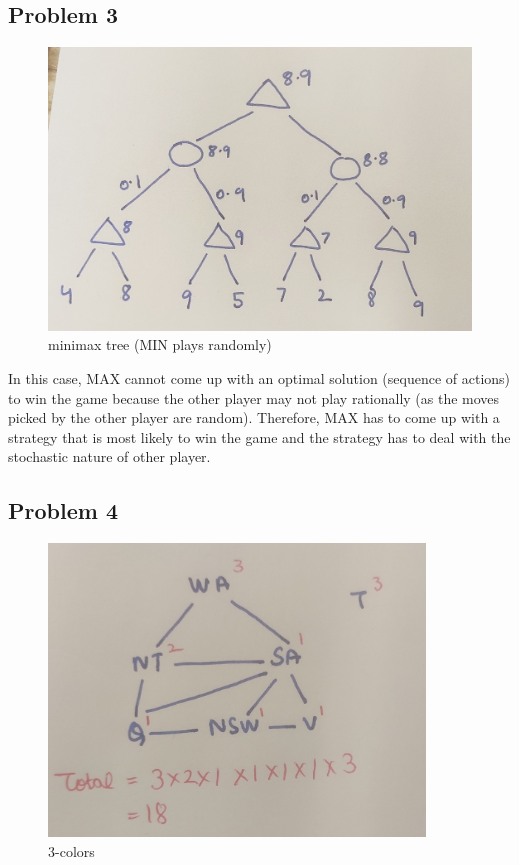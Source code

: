 \documentclass[12pt,a4paper]{article}
\begin{document}
\subsection*{Problem 3}

\begin{figure}[H]
    \centering
    \includegraphics[width=13cm]{prob3.jpg}
    \caption{minimax tree (MIN plays randomly)}
\end{figure}

In this case, MAX cannot come up with an optimal solution (sequence of actions) to win the game because the other player may not play rationally (as the moves picked by the other player are random). Therefore, MAX has to come up with a strategy that is most likely to win the game and the strategy has to deal with the stochastic nature of other player.


\subsection*{Problem 4}

\begin{figure}[H]
    \centering
    \includegraphics[width=10cm]{prob4_1.jpg}
    \caption{3-colors}
\end{figure}
\end{document}

